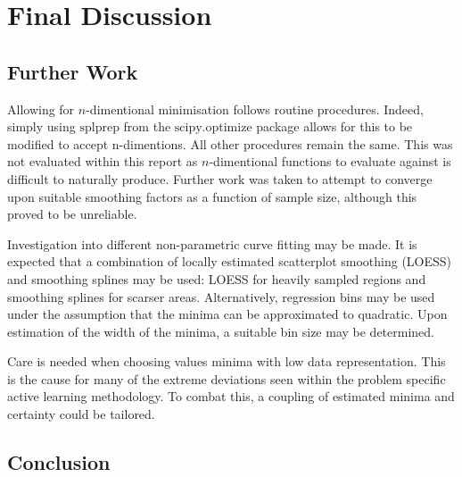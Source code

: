 \chapter{Final Discussion}

\ifpdf
    \graphicspath{{Chapter3/Figs/Raster/}{Chapter3/Figs/PDF/}{Chapter3/Figs/}}
\else
    \graphicspath{{Chapter3/Figs/Vector/}{Chapter3/Figs/}}
\fi

\section{Further Work}
Allowing for $n$-dimentional minimisation follows routine procedures. Indeed, simply using $\text{splprep}$ from the $\text{scipy.optimize}$ package allows for this to be modified to accept n-dimentions. All other procedures remain the same. This was not evaluated within this report as $n$-dimentional functions to evaluate against is difficult to naturally produce. Further work was taken to attempt to converge upon suitable smoothing factors as a function of sample size, although this proved to be unreliable.

Investigation into different non-parametric curve fitting may be made. It is expected that a combination of locally estimated scatterplot smoothing (LOESS) and smoothing splines may be used: LOESS for heavily sampled regions and smoothing splines for scarser areas. Alternatively, regression bins may be used under the assumption that the minima can be approximated to quadratic. Upon estimation of the width of the minima, a suitable bin size may be determined.

Care is needed when choosing values minima with low data representation. This is the cause for many of the extreme deviations seen within the problem specific active learning methodology. To combat this, a coupling of estimated minima and certainty could be tailored. 

\section{Conclusion}
